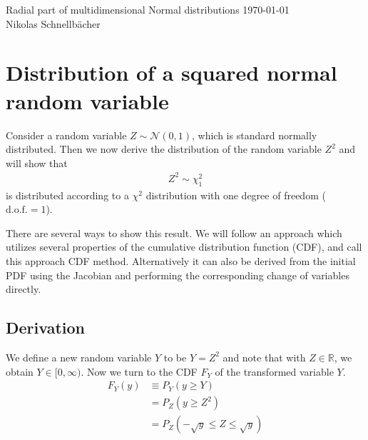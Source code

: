 \documentclass[11pt, DINA4, fleqn]{amsart}
\begin{document}

\tikzset{node distance = 2cm, auto}

\begin{flushleft}
{\sc \Large Radial part of multidimensional Normal distributions} \hfill \today \\
\medskip
Nikolas Schnellbächer \underline{\hspace{6.53in}} \\
\end{flushleft}

\section*{Distribution of a squared normal random variable}
Consider a random variable $Z\sim \mathcal{N}(0,1)$, which is standard normally distributed. Then we now derive the distribution of the random variable $Z^2$ and will show that
\begin{align}
Z^2 \sim \chi_1^{2}
\end{align}
is distributed according to a $\chi^2$ distribution with one degree of freedom ($\text{d.o.f.} = 1$).

There are several ways to show this result. We will follow an approach which utilizes several properties of the cumulative distribution function (CDF), and call this approach CDF method. Alternatively it can also be derived from the initial PDF using the Jacobian and performing the corresponding change of variables directly.

\subsection*{Derivation}
We define a new random variable $Y$ to be $Y = Z^2$ and note that with
$Z\in\mathds{R}$, we obtain $Y\in[0,\infty)$. Now we turn to the CDF $F_Y$ of the transformed variable $Y$.
\begin{align}
F_{Y}(y) &\equiv P_Y(y \ge Y) \\
&= P_Z(y\ge Z^2) \\
&= P_Z(-\sqrt{y} \le Z \le \sqrt{y})
\end{align}
\end{document}
